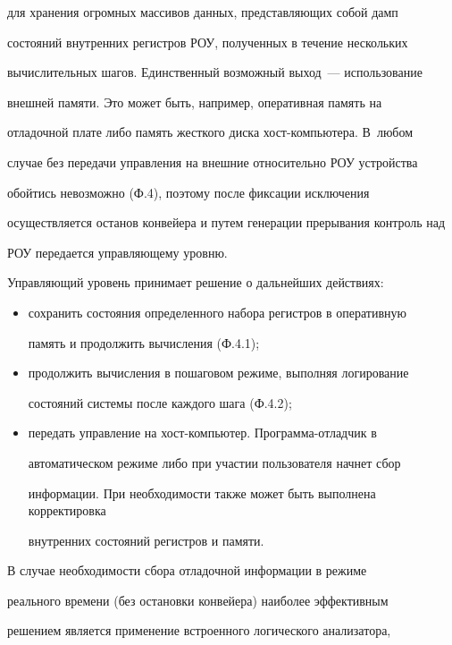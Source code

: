 для хранения огромных массивов данных, представляющих собой дамп 


состояний внутренних регистров РОУ, полученных в течение нескольких 


вычислительных шагов. Единственный возможный выход~--- использование 


внешней памяти. Это может быть, например, оперативная память на 


отладочной плате либо память жесткого диска хост-компью\-те\-ра. В~любом 


случае без передачи управления на внешние относительно РОУ устройства 


обойтись невозможно (Ф.4), поэтому после фиксации исключения 


осуществляется останов конвейера и путем генерации прерывания контроль над 


РОУ передается управляющему уровню.


      


      Управляющий уровень принимает решение о дальнейших действиях:


      \begin{itemize}


\item сохранить состояния определенного набора регистров в оперативную 


память и продолжить вычисления (Ф.4.1);


\item продолжить вычисления в пошаговом режиме, выполняя логирование 


состояний системы после каждого шага (Ф.4.2);


\item передать управление на хост-компьютер. Программа-отладчик в 


автоматическом режиме либо при участии пользователя начнет сбор 


информации. При необходимости также может быть выполнена корректировка 


внутренних состояний регистров и памяти.


\end{itemize}





      В случае необходимости сбора отладочной информации в режиме 


реального времени (без остановки конвейера) наиболее эффективным 


решением является применение встроенного логического анализатора, 


